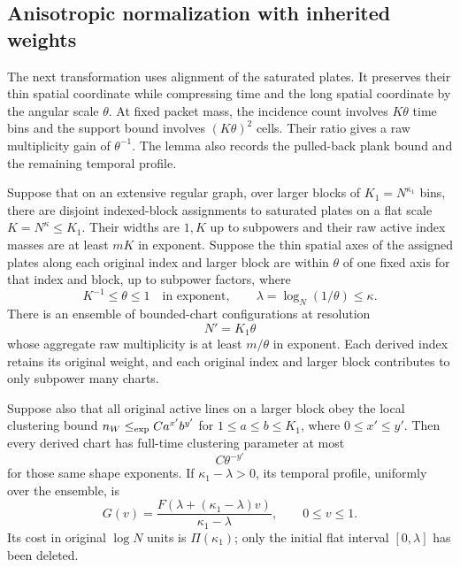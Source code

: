 \subsection{Anisotropic normalization with inherited weights}

The next transformation uses alignment of the saturated plates.
It preserves their thin spatial coordinate while compressing time
and the long spatial coordinate by the angular scale $\theta$.
At fixed packet mass, the incidence count involves $K\theta$
time bins and the support bound involves $(K\theta)^2$ cells.
Their ratio gives a raw multiplicity gain of $\theta^{-1}$.  The lemma
also records the pulled-back plank bound and the remaining temporal profile.

\begin{lemma}
\label{lem:anisotropic}
Suppose that on an extensive regular graph, over larger blocks of
$K_1=N^{\kappa_1}$ bins, there are disjoint indexed-block assignments
to saturated plates on a flat scale $K=N^\kappa\leq K_1$.  Their
widths are $1,K$ up to subpowers and their raw active index masses
are at least $mK$ in exponent.  Suppose the thin spatial axes of
the assigned plates along each original index and larger block
are within $\theta$ of one fixed axis for that index and block,
up to subpower factors, where
\[
 K^{-1}\leq\theta\leq1
 \quad\text{in exponent},\qquad
 \lambda=\log_N(1/\theta)\leq\kappa.
\]
There is an ensemble of bounded-chart configurations at resolution
\begin{equation}
 N'=K_1\theta
 \label{loc:anisotropic-resolution}
\end{equation}
whose aggregate raw multiplicity is at least $m/\theta$ in exponent.
Each derived index retains its original weight, and each original
index and larger block contributes to only subpower many charts.

Suppose also that all original active lines on a larger block obey
the local clustering bound $n_W\mathrel{\leq_{\mathrm{exp}}} C a^{x'}b^{y'}$ for
$1\leq a\leq b\leq K_1$, where $0\leq x'\leq y'$.  Then every
derived chart has full-time clustering parameter at most
\begin{equation}
 C\theta^{-y'}
 \label{loc:anisotropic-parameter}
\end{equation}
for those same shape exponents.
If $\kappa_1-\lambda>0$, its temporal profile, uniformly over the
ensemble, is
\begin{equation}
 G(v)=\frac{F(\lambda+(\kappa_1-\lambda)v)}
              {\kappa_1-\lambda},\qquad0\leq v\leq1.
 \label{loc:anisotropic-profile}
\end{equation}
Its cost in original $\log N$ units is $\Pi(\kappa_1)$; only the
initial flat interval $[0,\lambda]$ has been deleted.
\end{lemma}

